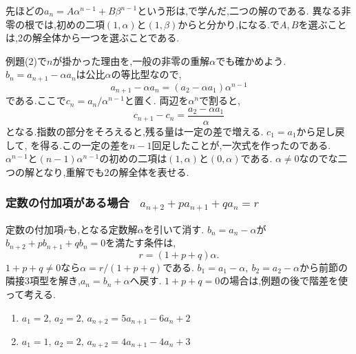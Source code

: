 \label{解釈：三項間と解全体}
    先ほどの$a_n=A\alpha^{n-1}+B\beta^{n-1}$という形は,で学んだ,二つの解のである.
    異なる非零の根では,初めの二項$(1,\alpha)$と$(1,\beta)$からと分かり,になる.で$A,B$を選ぶことは,2の解全体から一つを選ぶことである.

    例題(2)で$n$が掛かった理由を,一般の非零の重解$\alpha$でも確かめよう.
    $b_n=a_{n+1}-\alpha a_n$は公比$\alpha$の等比型なので,
    \[
      a_{n+1}-\alpha a_n=(a_2-\alpha a_1)\alpha^{n-1}
    \]
    である.ここで$c_n=a_n/\alpha^{n-1}$と置く.
    両辺を$\alpha^n$で割ると,
    \[
      c_{n+1}-c_n=\frac{a_2-\alpha a_1}{\alpha}
    \]
    となる.指数の部分をそろえると,残る量は一定の差で増える.
    $c_1=a_1$から足し戻して,
    \BookMathLayout{\[
      a_n=\left\{a_1+(n-1)\left(\frac{a_2}{\alpha}-a_1\right)\right\}\alpha^{n-1}
    \]}{\[
      \begin{aligned}
        a_n&=\left\{a_1+(n-1)\left(\frac{a_2}{\alpha}-a_1\right)\right\}\\
           &\qquad\cdot\alpha^{n-1}
      \end{aligned}
    \]}
    を得る.この一定の差を$n-1$回足したことが,一次式を作ったのである.
    $\alpha^{n-1}$と$(n-1)\alpha^{n-1}$の初めの二項は$(1,\alpha)$と$(0,\alpha)$である.
    $\alpha\ne0$なのでな二つの解となり,重解でも2の解全体を表せる.

  \subsubsection{\texorpdfstring{定数の付加項がある場合 \, $\displaystyle a_{n+2}+pa_{n+1}+qa_n=r$}{定数の付加項がある場合}}\label{節：等差二次特性方程式型}
    定数の付加項$r$も,となる定数解$\alpha$を引いて消す.
    $b_n=a_n-\alpha$が$b_{n+2}+pb_{n+1}+qb_n=0$を満たす条件は,
    \[
      r=(1+p+q)\alpha.
    \]
    $1+p+q\ne0$なら$\alpha=r/(1+p+q)$である.
    $b_1=a_1-\alpha,\ b_2=a_2-\alpha$から前節の隣接3項型を解き,$a_n=b_n+\alpha$へ戻す.
    $1+p+q=0$の場合は,例題の後で階差を使って考える.

    \noindent {}\par\nobreak
    \begin{enumerate}[label=(\arabic*),parsep=3pt,format=\bookitemlink{example-three-term-2}{problem}{answer}]
      \item $\displaystyle a_1=2,\,a_2=2,\, a_{n+2}=5a_{n+1}-6a_n+2$
      \item $\displaystyle a_1=1,\,a_2=2,\, a_{n+2}=4a_{n+1}-4a_n+3$
    \end{enumerate}

